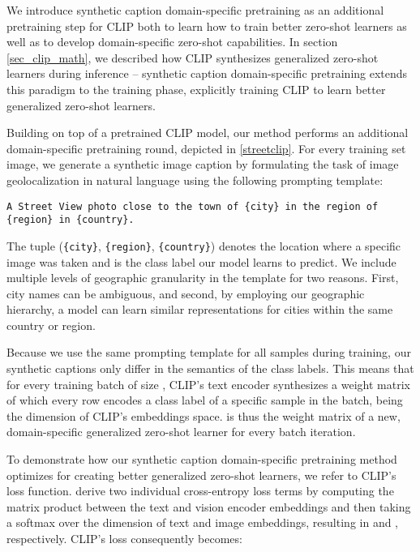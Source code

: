 \documentclass{article}
\begin{document}
We introduce synthetic caption domain-specific pretraining as an additional pretraining step for CLIP both to learn how to train better zero-shot learners as well as to develop domain-specific zero-shot capabilities. In section \ref{sec_clip_math}, we described how CLIP synthesizes generalized zero-shot learners during inference – synthetic caption domain-specific pretraining extends this paradigm to the training phase, explicitly training CLIP to learn better generalized zero-shot learners.

Building on top of a pretrained CLIP model, our method performs an additional domain-specific pretraining round, depicted in \cref{streetclip}. For every training set image, we generate a synthetic image caption by formulating the task of image geolocalization in natural language using the following prompting template: 

\begin{verbatim}
A Street View photo close to the town of {city} in the region of {region} in {country}.
\end{verbatim}
\label{tmp:training}

The tuple (\texttt{\{city\}}, \texttt{\{region\}}, \texttt{\{country\}}) denotes the location where a specific image was taken and is the class label our model learns to predict. We include multiple levels of geographic granularity in the template for two reasons. First, city names can be ambiguous, and second, by employing our geographic hierarchy, a model can learn similar representations for cities within the same country or region.

Because we use the same prompting template for all samples during training, our synthetic captions only differ in the semantics of the class labels. This means that for every training batch of size , CLIP's text encoder synthesizes a weight matrix  of which every row encodes a class label of a specific sample in the batch,  being the dimension of CLIP's embeddings space.  is thus the weight matrix of a new, domain-specific generalized zero-shot learner for every batch iteration.

To demonstrate how our synthetic caption domain-specific pretraining method optimizes for creating better generalized zero-shot learners, we refer to CLIP's loss function. \citet{radford21a} derive two individual cross-entropy loss terms by computing the matrix product between the text and vision encoder embeddings and then taking a softmax over the dimension of text and image embeddings, resulting in  and , respectively. CLIP's loss consequently becomes:
\end{document}
